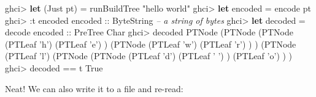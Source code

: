 \documentclass[]{article}
\newenvironment{Shaded}{}{}
\newcommand{\CharTok}[1]{\textcolor[rgb]{0.25,0.44,0.63}{#1}}
\newcommand{\CommentTok}[1]{\textcolor[rgb]{0.38,0.63,0.69}{\textit{#1}}}
\newcommand{\DataTypeTok}[1]{\textcolor[rgb]{0.56,0.13,0.00}{#1}}
\newcommand{\FunctionTok}[1]{\textcolor[rgb]{0.02,0.16,0.49}{#1}}
\newcommand{\KeywordTok}[1]{\textcolor[rgb]{0.00,0.44,0.13}{\textbf{#1}}}
\newcommand{\NormalTok}[1]{#1}
\newcommand{\OtherTok}[1]{\textcolor[rgb]{0.00,0.44,0.13}{#1}}
\newcommand{\StringTok}[1]{\textcolor[rgb]{0.25,0.44,0.63}{#1}}
\begin{document}
\begin{Shaded}
\begin{Highlighting}[]
\NormalTok{ghci}\FunctionTok{>} \KeywordTok{let}\NormalTok{ (}\DataTypeTok{Just}\NormalTok{ pt) }\FunctionTok{=}\NormalTok{ runBuildTree }\StringTok{"hello world"}
\NormalTok{ghci}\FunctionTok{>} \KeywordTok{let}\NormalTok{ encoded }\FunctionTok{=}\NormalTok{ encode pt}
\NormalTok{ghci}\FunctionTok{>} \FunctionTok{:}\NormalTok{t encoded}
\OtherTok{encoded ::} \DataTypeTok{ByteString}       \CommentTok{-- a string of bytes}
\NormalTok{ghci}\FunctionTok{>} \KeywordTok{let}\NormalTok{ decoded }\FunctionTok{=}\NormalTok{ decode}\OtherTok{ encoded ::} \DataTypeTok{PreTree} \DataTypeTok{Char}
\NormalTok{ghci}\FunctionTok{>}\NormalTok{ decoded}
\DataTypeTok{PTNode}\NormalTok{ (}\DataTypeTok{PTNode}\NormalTok{ (}\DataTypeTok{PTNode}\NormalTok{ (}\DataTypeTok{PTLeaf} \CharTok{'h'}\NormalTok{)}
\NormalTok{                       (}\DataTypeTok{PTLeaf} \CharTok{'e'}\NormalTok{)}
\NormalTok{               )}
\NormalTok{               (}\DataTypeTok{PTNode}\NormalTok{ (}\DataTypeTok{PTLeaf} \CharTok{'w'}\NormalTok{)}
\NormalTok{                       (}\DataTypeTok{PTLeaf} \CharTok{'r'}\NormalTok{)}
\NormalTok{               )}
\NormalTok{       )}
\NormalTok{       (}\DataTypeTok{PTNode}\NormalTok{ (}\DataTypeTok{PTLeaf} \CharTok{'l'}\NormalTok{)}
\NormalTok{               (}\DataTypeTok{PTNode}\NormalTok{ (}\DataTypeTok{PTNode}\NormalTok{ (}\DataTypeTok{PTLeaf} \CharTok{'d'}\NormalTok{)}
\NormalTok{                               (}\DataTypeTok{PTLeaf} \CharTok{' '}\NormalTok{)}
\NormalTok{                       )}
\NormalTok{                       (}\DataTypeTok{PTLeaf} \CharTok{'o'}\NormalTok{)}
\NormalTok{               )}
\NormalTok{       )}
\NormalTok{ghci}\FunctionTok{>}\NormalTok{ decoded }\FunctionTok{==}\NormalTok{ t}
\DataTypeTok{True}
\end{Highlighting}
\end{Shaded}

Neat! We can also write it to a file and re-read:
\end{document}
